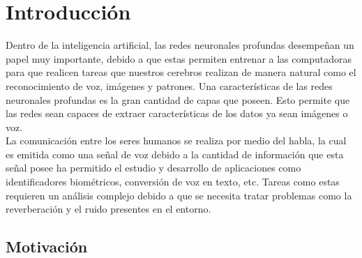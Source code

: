 \chapter{Introducción}
Dentro de la inteligencia artificial, las redes neuronales profundas desempeñan un papel muy importante, debido a que estas permiten entrenar a las computadoras para que realicen tareas que nuestros cerebros realizan de manera natural como el reconocimiento de voz, imágenes y patrones. Una características de las redes neuronales profundas es la gran cantidad de capas que poseen. Esto permite que las redes sean capaces de extraer características de los datos ya sean imágenes o voz.\\
 La comunicación entre los seres humanos se realiza por medio del habla, la cual es emitida como una señal de voz debido a la cantidad de información que esta señal posee ha permitido el estudio y desarrollo de aplicaciones como identificadores biométricos, conversión de voz en texto, etc. Tareas como estas requieren un análisis complejo debido a que se necesita tratar problemas como la reverberación y el ruido presentes en el entorno.




\section{Motivación}

